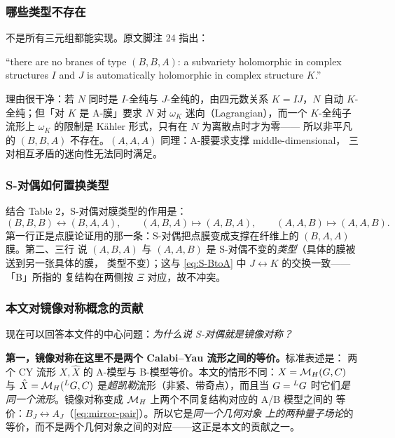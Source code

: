 \subsubsection*{哪些类型不存在}

不是所有三元组都能实现。原文脚注 24 指出：\pA{}
\begin{origquote}
“there are no branes of type $(B,B,A)$: a subvariety holomorphic in complex structures $I$ and $J$ is automatically holomorphic in complex structure $K$.”
\end{origquote}
理由很干净：若 $N$ 同时是 $I$-全纯与 $J$-全纯的，由四元数关系 $K=IJ$，$N$ 自动
$K$-全纯；但「对 $K$ 是 A-膜」要求 $N$ 对 $\omega_K$ 迷向（Lagrangian），而一个
$K$-全纯子流形上 $\omega_K$ 的限制是 Kähler 形式，只有在 $N$ 为离散点时才为零——
所以非平凡的 $(B,B,A)$ 不存在。$(A,A,A)$ 同理：A-膜要求支撑 middle-dimensional，
三对相互矛盾的迷向性无法同时满足。\pB{}

\subsubsection*{S-对偶如何置换类型}

结合 Table 2，S-对偶对膜类型的作用是：\pA{}
\begin{equation}
(B,B,B)\longleftrightarrow(B,A,A),\qquad
(A,B,A)\longmapsto(A,B,A),\qquad
(A,A,B)\longmapsto(A,A,B).
\label{eq:brane-permutation}
\end{equation}
第一行正是点膜论证用的那一条：S-对偶把点膜变成支撑在纤维上的 $(B,A,A)$ 膜。第二、三行
说 $(A,B,A)$ 与 $(A,A,B)$ 是 S-对偶不变的\emph{类型}（具体的膜被送到另一张具体的膜，
类型不变）；这与 \eqref{eq:S-BtoA} 中 $J\leftrightarrow K$ 的交换一致——「B」所指的
复结构在两侧按 $\Xi$ 对应，故不冲突。\pB{}

\subsubsection*{本文对镜像对称概念的贡献}

现在可以回答本文件的中心问题：\emph{为什么说 S-对偶就是镜像对称？}

\textbf{第一，镜像对称在这里不是两个 Calabi--Yau 流形之间的等价。}标准表述是：
两个 CY 流形 $X,\hat X$ 的 A-模型与 B-模型等价。本文的情形不同：$X=\mathcal{M}_H(G,C)$ 与
$\hat X=\mathcal{M}_H({}^{L}G,C)$ 是\emph{超凯勒}流形（非紧、带奇点），而且当 $G={}^{L}G$
时它们\emph{是同一个流形}。镜像对称变成 $\mathcal{M}_H$ 上两个不同复结构对应的 A/B 模型之间的
等价：$B_J\leftrightarrow A_J$（\eqref{eq:mirror-pair}）。所以它是\emph{同一个几何对象
上的两种量子场论}的等价，而不是两个几何对象之间的对应——这正是本文的贡献之一。
\pA{}

